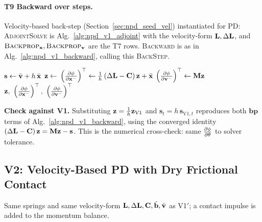 \paragraph{T9 Backward over steps.}\mbox{}
\newline Velocity-based back-step (Section~\ref{sec:npd_seed_vel}) instantiated for PD: \textsc{AdjointSolve} is Alg.~\ref{alg:npd_v1_adjoint} with the velocity-form $\mathbf{L}, \Delta\mathbf{L}$, and $\textsc{Backprop}_{\mathbf{x}}, \textsc{Backprop}_{\mathbf{v}}$ are the T7 rows. \textsc{Backward} is as in Alg.~\ref{alg:npd_v1_backward}, calling this \textsc{BackStep}.
\begin{algorithm}[H]
\caption{V1$'$: one back-step.}
\label{alg:npd_v1p_backward}
\begin{algorithmic}[1]
    \State $\mathbf{s} \gets \bar{\mathbf{v}} + h\,\bar{\mathbf{x}}$ 
    \State $\mathbf{z} \gets$  
    \State $\left(\frac{\partial \phi}{\partial \mathbf{x}^-}\right)^\top \gets \tfrac{1}{h}\left(\Delta\mathbf{L} - \mathbf{C}\right)\mathbf{z} + \bar{\mathbf{x}}$ 
    \State $\left(\frac{\partial \phi}{\partial \mathbf{v}^-}\right)^\top \gets \mathbf{M}\mathbf{z}$ 
    \State \Return $\z,\ \left(\pdc{\phi}{\x^-}\right)^\top,\ \left(\pdc{\phi}{\vv^-}\right)^\top$
\EndFunction
\end{algorithmic}
\end{algorithm}
\noindent \textbf{Check against V1.} Substituting $\mathbf{z} = \tfrac{1}{h}\mathbf{z}_{\text{V1}}$ and $\mathbf{s}_t = h\,\mathbf{s}_{\text{V1},t}$ reproduces both $\mathbf{bp}$ terms of Alg.~\ref{alg:npd_v1_backward}, using the converged identity $\left(\Delta\mathbf{L} - \mathbf{C}\right)\mathbf{z} = \mathbf{M}\mathbf{z} - \mathbf{s}$. This is the numerical cross-check: same $\frac{\partial \phi}{\partial \theta}$ to solver tolerance.

\subsection{V2: Velocity-Based PD with Dry Frictional Contact}
\label{sec:npd_v2}

\noindent Same springs and same velocity-form $\mathbf{L}, \Delta\mathbf{L}, \mathbf{C}, \tilde{\mathbf{b}}, \tilde{\mathbf{v}}$ as V1$'$; a contact impulse is added to the momentum balance.

